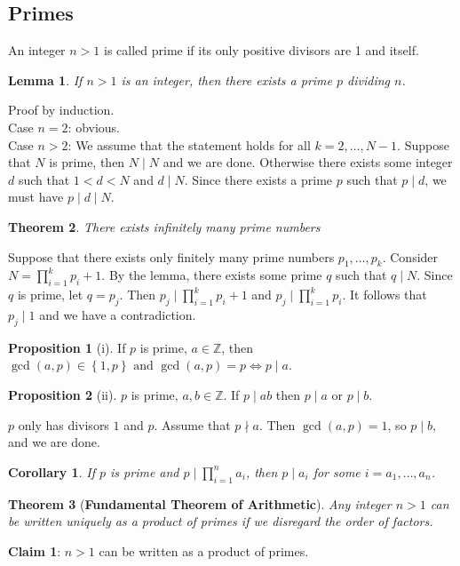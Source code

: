 \documentclass[11pt]{article}
\newtheorem{thm}{Theorem}[section]
\newtheorem{cor}{Corollary}[thm]
\newtheorem{lemma}[thm]{Lemma}
\theoremstyle{definition}
\newtheorem{prop}{Proposition}[section]
\newcommand{\The}[2]{\begin{#1}#2\end{#1}}
\newcommand{\set}[1]{\left\{ #1 \right\}}
\newcommand{\rng}[2]{#1,\dots,#2}
\newcommand{\srng}[3]{#1_#2,\dots,#1_#3}
\newcommand{\et}[0]{\text{ and }}
\newcommand{\ZZ}{\mathbb{Z}}
\begin{document}
\subsection{Primes}
\The{defn} {
	An integer $n>1$ is called prime if its only positive divisors are 1 and itself.
}


\begin{lemma} If $n>1$ is an integer, then there exists a prime $p$ dividing $n$. \end{lemma}
\proof Proof by induction. 
\\Case $n=2$: obvious. 
\\Case $n>2$: We assume that the statement holds for all $k=\rng{2}{N-1}$. Suppose that $N$ is prime, then $N\mid N$ and we are done. Otherwise there exists some integer $d$ such that $1<d<N$ and $d\mid N$. Since there exists a prime $p$ such that $p\mid d$, we must have $p\mid d\mid N$.
\qedhere

\begin{thm}There exists infinitely many prime numbers\end{thm}
\proof Suppose that there exists only finitely many prime numbers $\srng{p}{1}{k}$. Consider $N = \prod_{i=1}^{k}p_i + 1.$
By the lemma, there exists some prime $q$ such that $q\mid N$. Since $q$ is prime, let $q=p_j$. Then $p_j\mid \prod_{i=1}^{k}p_i + 1$ and $p_j\mid \prod_{i=1}^{k}p_i$. It follows that $p_j\mid 1$ and we have a contradiction.
\qedhere

\begin{prop}[i] If $p$ is prime, $a\in\ZZ$, then $\gcd(a,p)\in\set{1,p} \et \gcd(a,p)=p\iff p\mid a$. \end{prop}
\begin{prop}[ii] $p$ is prime, $a,b\in\ZZ$. If $p\mid ab$ then $p\mid a$ or $p\mid b$. \end{prop}
 $p$ only has divisors $1$ and $p$. 
\proof[Proof of (ii)] Assume that $p\nmid a$. Then $\gcd(a,p)=1$, so $p\mid b$, and we are done. \qedhere

\begin{cor} If $p$ is prime and $p\mid \prod_{i=1}^{n} a_i$, then $p\mid a_i$ for some $i=\srng{a}{1}{n}$. \end{cor}

\begin{thm}[\textbf{Fundamental Theorem of Arithmetic}]
Any integer $n>1$ can be written uniquely as a product of primes if we disregard the order of factors. 
\end{thm}
\proof 
\textbf{Claim 1}: $n>1$ can be written as a product of primes.
\end{document}
